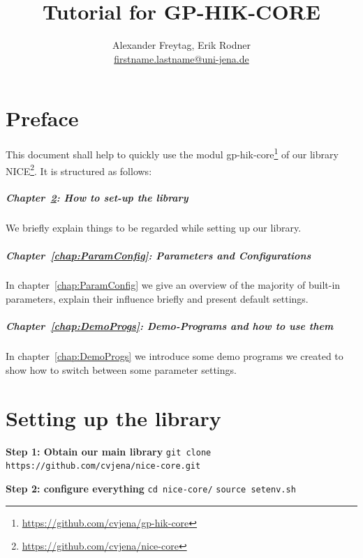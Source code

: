 \documentclass[a4paper]{scrreprt}
\title{Tutorial for GP-HIK-CORE}
\author{Alexander Freytag, Erik Rodner \\ \url{firstname.lastname@uni-jena.de}}
\begin{document}
\maketitle

\setlength{\parindent}{0pt}
\renewcommand{\chaptername}{chapter}

\chapter{Preface}
\label{chap:Preface}
This document shall help to quickly use the modul gp-hik-core\footnote{\url{https://github.com/cvjena/gp-hik-core}} of our library NICE\footnote{\url{https://github.com/cvjena/nice-core}}.
It is structured as follows: 

\paragraph{Chapter~\ref{chap:SetUp}: How to set-up the library} We briefly explain things to be regarded while setting up our library.

\paragraph{Chapter~\ref{chap:ParamConfig}: Parameters and Configurations}
In \chaptername~\ref{chap:ParamConfig} we give an overview of the majority of built-in parameters, explain their influence briefly and present default settings.

\paragraph{Chapter~\ref{chap:DemoProgs}: Demo-Programs and how to use them}
In \chaptername~\ref{chap:DemoProgs} we introduce some demo programs we created to show how to switch between some parameter settings.


\chapter{Setting up the library}
\label{chap:SetUp}


\textbf{Step 1: Obtain our main library}\newline
\texttt{git clone https://github.com/cvjena/nice-core.git}
\vspace{2em}

\textbf{Step 2: configure everything}\newline
\texttt{cd nice-core/} \newline
\texttt{source setenv.sh}
\vspace{2em}
\end{document}
